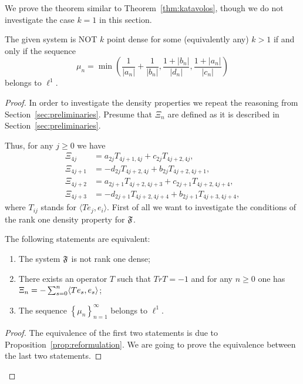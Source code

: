   We prove the theorem similar to Theorem~\ref{thm:katavolos}, though we do not investigate the case $k = 1$ in this section.
    \begin{theorem}
      The given system is NOT $k$ point dense for some (equivalently any) $k > 1$ if and only if the sequence
      \[
        \mu_n = \min\left(\frac{1}{|a_n|} + \frac{1}{|b_n|}, \frac{1 + |b_n|}{|d_n|}, \frac{1 + |a_n|}{|c_n|}\right)
      \]
        belongs to $\ell^1$.
    \end{theorem}
    \begin{proof}
      In order to investigate the density properties we repeat the reasoning from Section~\ref{sec:preliminaries}.
      Presume that $\Xi_n$ are defined as it is described in Section~\ref{sec:preliminaries}.

      Thus, for any $j \geq 0$ we have
      \begin{align*}
        \Xi_{4j} &= a_{2j} T_{4j+1, 4j} + c_{2j} T_{4j+2, 4j},\\
        \Xi_{4j + 1} &= -d_{2j} T_{4j+2, 4j} + b_{2j} T_{4j+2, 4j+1},\\
        \Xi_{4j + 2} &= a_{2j+1} T_{4j+2, 4j+3} + c_{2j+1} T_{4j+2, 4j+4},\\
        \Xi_{4j + 3} &= -d_{2j+1} T_{4j+2, 4j+4} + b_{2j+1} T_{4j+3, 4j+4},
      \end{align*}
        where $T_{ij}$ stands for $\langle Te_j, e_i \rangle$.
      First of all we want to investigate the conditions of the rank one density property for $\mathfrak{F}$.
      \begin{prop}
        \label{prop:inf-dim}
        The following statements are equivalent:
        \begin{enumerate}
          \item The system $\mathfrak{F}$ is not rank one dense;
          \item There exists an operator $T$ such that $TrT = -1$ and for any $n \geq 0$ one has $\Xi_n = -\sum_{s=0}^n \langle Te_s, e_s \rangle$;
          \item The sequence $\left\{\mu_n\right\}_{n=1}^\infty$ belongs to $\ell^1$.
        \end{enumerate}
      \end{prop}
      \begin{proof}
        The equivalence of the first two statements is due to Proposition~\ref{prop:reformulation}.
        We are going to prove the equivalence between the last two statements.


\end{proof}
\end{proof}
